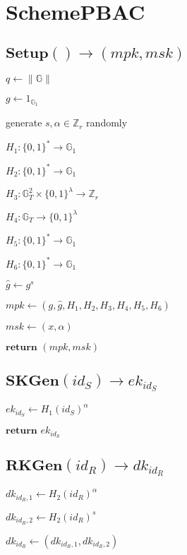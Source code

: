 \documentclass[a4paper]{article}
\begin{document}
\section{SchemePBAC}

\subsection{$\textbf{Setup}() \rightarrow (\textit{mpk}, \textit{msk})$}

$q \gets \|\mathbb{G}\|$

$g \gets 1_{\mathbb{G}_1}$

generate $s, \alpha \in \mathbb{Z}_r$ randomly

$H_1: \{0, 1\}^* \rightarrow \mathbb{G}_1$

$H_2: \{0, 1\}^* \rightarrow \mathbb{G}_1$

$H_3: \mathbb{G}_T^2 \times \{0, 1\}^\lambda \rightarrow \mathbb{Z}_r$

$H_4: \mathbb{G}_T \rightarrow \{0, 1\}^\lambda$

$H_5: \{0, 1\}^* \rightarrow \mathbb{G}_1$

$H_6: \{0, 1\}^* \rightarrow \mathbb{G}_1$

$\hat{g} \gets g^s$

$ \textit{mpk} \gets (g, \hat{g}, H_1, H_2, H_3, H_4, H_5, H_6)$

$\textit{msk} \gets (x, \alpha)$

$\textbf{return }(\textit{mpk}, \textit{msk})$

\subsection{$\textbf{SKGen}(\textit{id}_S) \rightarrow \textit{ek}_{\textit{id}_S}$}

$\textit{ek}_{\textit{id}_S} \gets H_1(\textit{id}_S)^\alpha$

$\textbf{return }\textit{ek}_{\textit{id}_S}$

\subsection{$\textbf{RKGen}(\textit{id}_R) \rightarrow \textit{dk}_{\textit{id}_R}$}

$\textit{dk}_{\textit{id}_R, 1} \gets H_2(\textit{id}_R)^\alpha$

$\textit{dk}_{\textit{id}_R, 2} \gets H_2(\textit{id}_R)^s$

$\textit{dk}_{\textit{id}_R} \gets (\textit{dk}_{\textit{id}_R, 1}, \textit{dk}_{\textit{id}_R, 2})$
\end{document}
